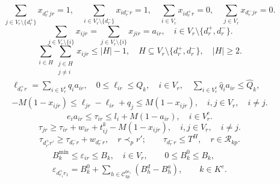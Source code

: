 \documentclass{setp-new}
\begin{document}
\begin{equation}
\sum_{j\in V_r\setminus\{d_r^{+}\}}x_{d_r^{+}jr}=1,\quad
\sum_{i\in V_r\setminus\{d_r^{-}\}}x_{id_r^{-}r}=1,\quad
\sum_{i\in V_r}x_{id_r^{+}r}=0,\quad
\sum_{j\in V_r}x_{d_r^{-}jr}=0 .
\label{eq:unified-trip-start-end}
\end{equation}
\begin{equation}
\sum_{j\in V_r\setminus\{i\}}x_{ijr}
=\sum_{j\in V_r\setminus\{i\}}x_{jir}=a_{ir},
\quad i\in V_r\setminus\{d_r^{+},d_r^{-}\}.
\label{eq:unified-flow}
\end{equation}
\begin{equation}
\sum_{i\in H}\sum_{\substack{j\in H\\j\ne i}}x_{ijr}
\le |H|-1,
\quad H\subseteq V_r\setminus\{d_r^{+},d_r^{-}\},\quad |H|\ge2.
\label{eq:unified-subtour}
\end{equation}
\begin{equation}
\begin{gathered}
\ell_{d_r^{+}r}=\sum_{i\in V_r^{c}}q_i a_{ir},\quad
0\le\ell_{ir}\le Q_k,\quad i\in V_r,\quad
\sum_{i\in V_r^{c}}\hat q_i a_{ir}\le\hat Q_k,\\
-M(1-x_{ijr})
\le\ell_{jr}-\ell_{ir}+q_j
\le M(1-x_{ijr}),\quad i,j\in V_r,\quad i\ne j .
\end{gathered}
\label{eq:unified-load-bound}
\end{equation}
\begin{equation}
e_i a_{ir}
\le\tau_{ir}\le l_i+M(1-a_{ir}),
\quad i\in V_r^{c}.
\label{eq:unified-time-window}
\end{equation}
\begin{equation}
\tau_{jr}
\ge\tau_{ir}+w_{ir}+t_{ij}^{k}-M(1-x_{ijr}),
\quad i,j\in V_r,\quad i\ne j .
\label{eq:unified-time-propagation}
\end{equation}
\begin{equation}
\tau_{d_{r'}^{+}r'}
\ge\tau_{d_r^{-}r}+w_{d_r^{-}r},\quad r\prec_p r';\qquad
\tau_{d_r^{-}r}\le T^{H},\quad r\in\mathcal R_{kp}.
\label{eq:unified-trip-link-time}
\end{equation}
\begin{equation}
\begin{gathered}
B_k^{\min}\le\varepsilon_{ir}\le B_k,\quad i\in V_r,\qquad
0\le B_k^{0}\le B_k,\\
\varepsilon_{d_{r_1}^{+}r_1}
=B_k^{0}+\sum_{h\in\mathcal C_{kp}^{0r_1}}(B_h^{d}-B_h^{a}),\qquad k\in K^{e}.
\end{gathered}
\label{eq:unified-battery-bound}
\end{equation}
\end{document}
